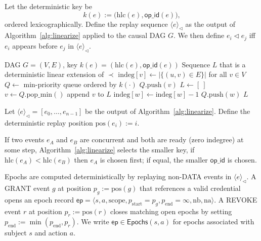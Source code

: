 \documentclass[10pt,journal,compsoc]{IEEEtran}
\begin{document}
\medskip

Let the deterministic key be
\[
  k(e) := \big(\mathrm{hlc}(e),\mathsf{op\_id}(e)\big),
\]
ordered lexicographically. Define the replay sequence $\langle e\rangle_{\triangleleft}$ as the output of Algorithm~\ref{alg:linearize} applied to the causal DAG $G$. We then define $e_i \triangleleft e_j$ iff $e_i$ appears before $e_j$ in $\langle e\rangle_{\triangleleft}$.

\begin{algorithm}[!htbp]
\caption{Deterministic linearization of a causal DAG}
\label{alg:linearize}
\begin{algorithmic}[1]
\Require DAG $G=(V,E)$, key $k(e)=(\mathrm{hlc}(e),\mathsf{op\_id}(e))$
\Ensure Sequence $L$ that is a deterministic linear extension of $\prec$
\State $\mathrm{indeg}[v] \gets |\{(u,v)\in E\}|$ for all $v\in V$
\State $Q \gets$ min-priority queue ordered by $k(\cdot)$
  \State $Q.\mathrm{push}(v)$
\EndFor
\State $L \gets [\ ]$
  \State $v \gets Q.\mathrm{pop\_min}()$
  \State append $v$ to $L$
    \State $\mathrm{indeg}[w] \gets \mathrm{indeg}[w]-1$
      \State $Q.\mathrm{push}(w)$
    \EndIf
  \EndFor
\EndWhile
\State \Return $L$
\end{algorithmic}
\end{algorithm}

\noindent Let $\langle e \rangle_{\triangleleft} = [e_0,\dots,e_{n-1}]$ be the output of Algorithm~\ref{alg:linearize}.
Define the deterministic replay position $\mathrm{pos}(e_i) := i$.

If two events $e_A$ and $e_B$ are concurrent and both are ready (zero indegree) at some step, Algorithm~\ref{alg:linearize} selects the smaller key, if $\mathrm{hlc}(e_A)<\mathrm{hlc}(e_B)$ then $e_A$ is chosen first; if equal, the smaller $\mathsf{op\_id}$ is chosen.


\medskip

Epochs are computed deterministically by replaying non-\textsc{DATA} events in $\langle e \rangle_{\triangleleft}$.
A \textsc{GRANT} event $g$ at position $p_g := \mathrm{pos}(g)$ that references a valid credential opens an epoch record
$\mathsf{ep} = \langle s,a,\mathrm{scope}, p_{\mathrm{start}}{=}p_g, p_{\mathrm{end}}{=}\infty, \mathrm{nb}, \mathrm{na} \rangle$.
A \textsc{REVOKE} event $r$ at position $p_r := \mathrm{pos}(r)$ closes matching open epochs by setting
$p_{\mathrm{end}} := \min(p_{\mathrm{end}}, p_r)$.
We write $\mathsf{ep}\in \mathsf{Epochs}(s,a)$ for epochs associated with subject $s$ and action $a$.
\end{document}

